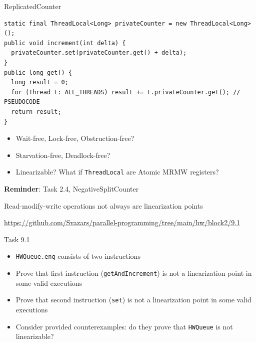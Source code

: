 \begin{frame}[t,fragile]{ReplicatedCounter}

\begin{verbatim}
static final ThreadLocal<Long> privateCounter = new ThreadLocal<Long>();
public void increment(int delta) {
  privateCounter.set(privateCounter.get() + delta);   
}
public long get() { 
  long result = 0;
  for (Thread t: ALL_THREADS) result += t.privateCounter.get(); // PSEUDOCODE
  return result;
}
\end{verbatim}


\begin{itemize}  
  \item Wait-free, Lock-free, Obstruction-free?
  \item Starvation-free, Deadlock-free?
  \pause
  \item Linearizable? \pause What if \texttt{ThreadLocal} are Atomic MRMW registers?
\end{itemize}

\pause \textbf{Reminder}: Task 2.4, NegativeSplitCounter
\end{frame}


\begin{frame}[t,fragile]{Read-modify-write operations not always are linearization points}

{\small\url{https://github.com/Svazars/parallel-programming/tree/main/hw/block2/9.1}}
\begin{homeworkmail}{Task 9.1}
    \begin{itemize}      
      \item \texttt{HWQueue.enq} consists of two instructions
      \item Prove that first instruction (\texttt{getAndIncrement}) is not a linearization point in some valid executions
      \item Prove that second instruction (\texttt{set}) is not a linearization point in some valid executions
      \item Consider provided counterexamples: do they prove that \texttt{HWQueue} is not linearizable?
    \end{itemize}
\end{homeworkmail}
\end{frame}


